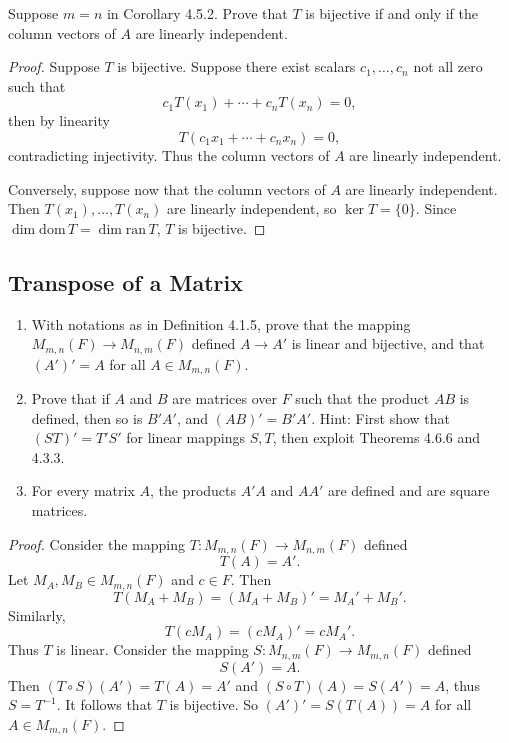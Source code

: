 \begin{tcolorbox}[title=Exercise 2, breakable]
    Suppose $m = n$ in Corollary 4.5.2. Prove that $T$ is bijective 
    if and only if the column vectors of $A$ are linearly independent.
\end{tcolorbox}

\begin{proof}
    Suppose $T$ is bijective.
    Suppose there exist scalars $c_1, \ldots, c_n$ not all zero such that
    \[
    c_1 T(x_1) + \cdots + c_n T(x_n) = 0,
    \]
    then by linearity
    \[
    T(c_1 x_1 + \cdots + c_n x_n) = 0,
    \]
    contradicting injectivity. Thus the column vectors of $A$ are linearly independent.

    Conversely, suppose now that the column vectors of $A$ are linearly independent.
    Then $T(x_1), \ldots, T(x_n)$ are linearly independent, so $\ker T = \{0\}$.
    Since $\dim \mathrm{dom}\, T = \dim \mathrm{ran}\, T$, $T$ is bijective.
\end{proof}

\subsection{Transpose of a Matrix}


\begin{tcolorbox}[title=Exercise 1, breakable]
    \begin{enumerate}
        \item With notations as in Definition 4.1.5, prove that the mapping $M_{m, n}(F) \longrightarrow M_{n, m}(F)$ defined $A \longrightarrow A'$ is linear and bijective, and that $(A')' = A$ for all $A \in M_{m, n}(F)$.
        \item Prove that if $A$ and $B$ are matrices over $F$ such that the product $AB$ is defined, then so is $B'A'$, and $(AB)' = B'A'$. {Hint: First show that $(ST)' = T'S'$ for linear mappings $S, T$, then exploit Theorems 4.6.6 and 4.3.3.}
        \item For every matrix $A$, the products $A'A$ and $AA'$ are defined and are square matrices.
    \end{enumerate}
\end{tcolorbox}

\begin{proof}
    Consider the mapping $T : M_{m, n}(F) \longrightarrow M_{n, m}(F)$ defined
    \[T(A) = A'.\]
    Let $M_A, M_B \in M_{m, n}(F)$ and $c \in F$.
    Then
    \[T(M_A + M_B) = (M_A + M_B)' = M_A' + M_B'.\]
    Similarly,
    \[T(cM_A) = (cM_A)' = cM_A'.\]
    Thus $T$ is linear.
    Consider the mapping $S : M_{n, m}(F) \longrightarrow M_{m, n}(F)$ defined
    \[S(A') = A.\]
    Then $(T \circ S)(A') = T(A) = A'$ and $(S \circ T)(A) = S(A') = A$, thus $S = T^{-1}$.
    It follows that $T$ is bijective. So $(A')' = S(T(A)) = A$ for all $A \in M_{m,n}(F)$.
\end{proof}

